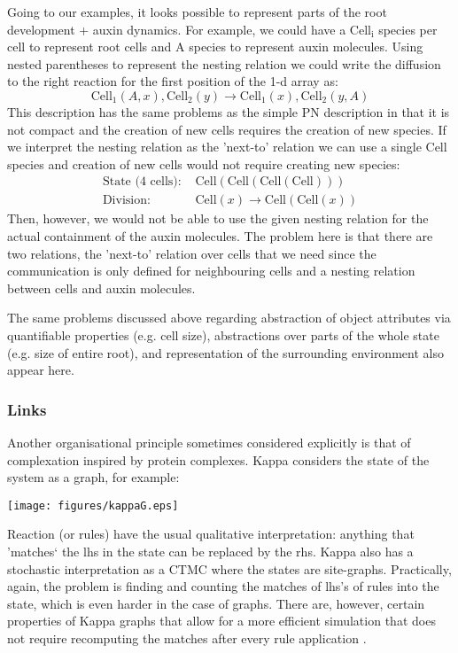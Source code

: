 \documentclass[phd]{infthesis}
\newcommand{\eg}{e.g.\xspace}
\begin{document}
Going to our examples, it looks possible to represent parts of the root
development + auxin dynamics. For example, we could have a $\mathrm{Cell_i}$
species per cell to represent root cells and $\mathrm{A}$ species to represent auxin
molecules. Using nested parentheses to represent the nesting relation we could
write the diffusion to the right reaction for the first position of the 1-d
array as:
$$
\mathrm{Cell_1}(A, x), \mathrm{Cell_2}(y) \rightarrow \mathrm{Cell_1}(x), \mathrm{Cell_2}(y, A)
$$
This description has the same problems as the simple PN description in that it is
not compact and the creation of new cells requires the creation of new
species. If we interpret the nesting relation as the 'next-to' relation we
can use a single $\mathrm{Cell}$ species and creation of new cells would not
require creating new species:
\begin{align*}
  \text{State (4 cells): } & \mathrm{Cell(Cell(Cell(Cell)))} \\
  \text{Division: } & \mathrm{Cell}(x) \rightarrow \mathrm{Cell}(\mathrm{Cell}(x))
\end{align*}
Then, however, we would not be able to use the given nesting relation for the
actual containment of the auxin molecules. The problem here is that there are
two relations, the 'next-to' relation over cells that we need since the
communication is only defined for neighbouring cells and a nesting relation
between cells and auxin molecules.

The same problems discussed above regarding abstraction of object attributes via
quantifiable properties (\eg cell size), abstractions over parts of the whole
state (\eg size of entire root), and representation of the surrounding
environment also appear here.

\subsubsection*{Links}
Another organisational principle sometimes considered explicitly is that of
complexation inspired by protein complexes. Kappa \citep{danos_formal_2004}
considers the state of the system as a graph, for example:
\begin{center}
    \texttt{[image: figures/kappaG.eps]}
  \end{center}
Reaction (or rules) have the usual qualitative interpretation: anything that
'matches` the lhs in the state can be replaced by the rhs. Kappa
also has a stochastic interpretation as a CTMC where the states are
site-graphs. Practically, again, the problem is finding and counting the matches
of lhs's of rules into the state, which is even harder in the case of
graphs. There are, however, certain properties of Kappa graphs that
allow for a more efficient simulation that does not require recomputing the
matches after every rule application \citep{danos_scalable_2007}.
  
\end{document}
